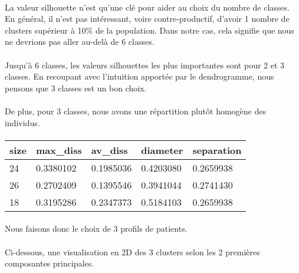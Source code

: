 \documentclass[11pt]{article}
\begin{document}
\paragraph{}
La valeur silhouette n'est qu'une clé pour aider au choix du nombre de
classes. En général, il n'est pas intéressant, voire contre-productif,
d'avoir 1 nombre de clusters supérieur à 10\% de la population. Dans
notre cas, cela signifie que nous ne devrions pas aller au-delà de 6
classes.
\paragraph{}
Jusqu'à 6 classes, les valeurs silhouettes les plus importantes sont
pour 2 et 3 classes. En recoupant avec l'intuition apportée par le
dendrogramme, nous pensons que 3 classes est un bon choix.
\paragraph{}
De plus, pour 3 classes, nous avons une répartition plutôt homogène des
individus.
\paragraph{}


    \begin{tabular}{lllll}
 size & max\_diss & av\_diss & diameter & separation\\
\hline
	 24        & 0.3380102 & 0.1985036 & 0.4203080 & 0.2659938\\
	 26        & 0.2702409 & 0.1395546 & 0.3941044 & 0.2741430\\
	 18        & 0.3195286 & 0.2347373 & 0.5184103 & 0.2659938\\
\end{tabular}

\paragraph{}
    
    Nous faisons donc le choix de 3 profils de patients.
\paragraph{}
    Ci-dessous, une visualisation en 2D des 3 clusters selon les 2 premières
composantes principales.



    \begin{center}
    \end{center}
    
\end{document}
